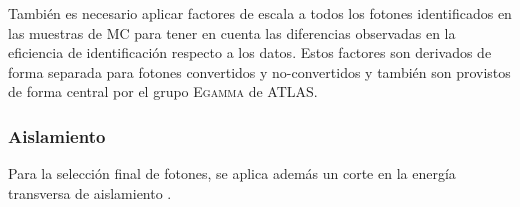 
También es necesario aplicar factores de escala a todos los fotones
identificados en las muestras de MC para tener en cuenta las diferencias
observadas en la eficiencia de identificación respecto a los datos. Estos
factores son derivados de forma separada para fotones convertidos y
no-convertidos y también son provistos de forma central por el grupo
\textsc{Egamma} de ATLAS.


\subsubsection{Aislamiento}

Para la selección final de fotones, se aplica además un corte en la energía
transversa de aislamiento {\etiso}.



